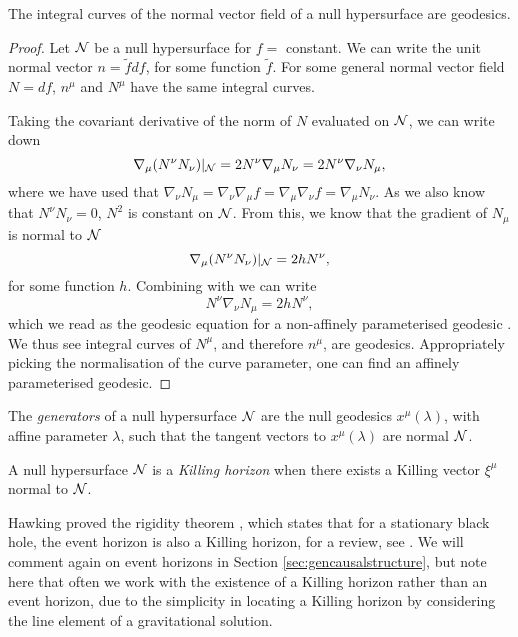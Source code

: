 \begin{prop}
The integral curves of the normal vector field of a null hypersurface are geodesics.	
\end{prop}
\begin{proof}
	Let ${\cal N}$ be a null hypersurface for $f = $ constant. We can write the unit normal vector $n = \tilde{f} df$, for some function $\tilde{f}$. For some general normal vector field $N = df$, $n^\mu$ and $N^\mu$ have the same integral curves. 
	
	Taking the covariant derivative of the norm of $N$ evaluated on ${\cal N}$, we can write down
	\begin{equation}
	\label{eq:geoproof1}
		\nabla_\mu (N^\nu N_\nu) |_{\cal N} = 2 N^\nu \nabla_\mu N_\nu  = 2 N^\nu \nabla_\nu N_\mu,
	\end{equation}
	where we have used that $\nabla_\nu N_\mu = \nabla_\nu \nabla_\mu f = \nabla_\mu \nabla_\nu f = \nabla_\mu N_\nu$.
	As we also know that $N^\nu N_\nu = 0$, $N^2$ is constant on ${\cal N}$. From this, we know that the gradient of $N_\mu$ is normal to ${\cal N}$
	\begin{equation}
	\label{eq:geoproof2}
		\nabla_\mu (N^\nu N_\nu) |_{\cal N} = 2 h N^\nu,
	\end{equation}
	for some function $h$. 
	Combining  with  we can write
	\begin{equation*}
		N^\nu \nabla_\nu N_\mu = 2 h N^\nu,
	\end{equation*}
	which we read as the geodesic equation for a non-affinely parameterised geodesic . We thus see integral curves of $N^\mu$, and therefore $n^\mu$, are geodesics. Appropriately picking the normalisation of the curve parameter, one can find an affinely parameterised geodesic.
\end{proof}

\begin{defn}
The \emph{generators} of a null hypersurface ${\cal N}$ are the null geodesics $x^\mu(\lambda)$, with affine parameter $\lambda$, such that the tangent vectors to $x^\mu(\lambda)$ are normal ${\cal N}$. 
\end{defn}

\begin{defn}
	A null hypersurface ${\cal N}$ is a \emph{Killing horizon} when there exists a Killing vector $\xi^\mu$ normal to ${\cal N}$.  
\end{defn}

Hawking proved the rigidity theorem \cite{Hawking:1973uf}, which states that for a stationary black hole, the event horizon is also a Killing horizon, for a review, see \cite{Ionescu:2015dna}. We will comment again on event horizons in Section \ref{sec:gencausalstructure}, but note here that often we work with the existence of a Killing horizon rather than an event horizon, due to the simplicity in locating a Killing horizon by considering the line element of a gravitational solution.

